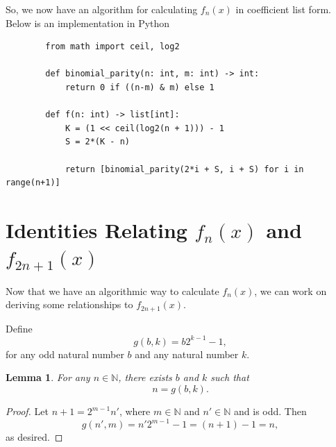 \documentclass[a4paper]{article}
\newtheorem{lemma}{Lemma}
\newcommand{\N}{\mathbb{N}}
\begin{document}
	So, we now have an algorithm for calculating $f_n(x)$ in coefficient list form.
	Below is an implementation in Python
	\begin{center}
	\begin{verbatim}
		from math import ceil, log2
			
		def binomial_parity(n: int, m: int) -> int:
    		return 0 if ((n-m) & m) else 1
			
		def f(n: int) -> list[int]:
    		K = (1 << ceil(log2(n + 1))) - 1
    		S = 2*(K - n)
			
    		return [binomial_parity(2*i + S, i + S) for i in range(n+1)]
	\end{verbatim}
	\end{center}

	\section{Identities Relating $f_n(x)$ and $f_{2n+1}(x)$}
	Now that we have an algorithmic way to calculate $f_n(x)$, we can work on deriving some relationships to $f_{2n+1}(x)$.
	
	Define
	\begin{equation*}
		g(b,k) = b 2^{k-1} - 1,
	\end{equation*}
	for any odd natural number $b$ and any natural number $k$.
	
	\begin{lemma}
		For any $n \in \N$, there exists $b$ and $k$ such that
		\begin{equation*}
			n = g(b,k).
		\end{equation*}
	\end{lemma}
	\begin{proof}
		Let $n+1 = 2^{m-1}n'$, where $m \in \N$ and $n' \in \N$ and is odd.
		Then
		\begin{equation*}
			g(n', m) = n'2^{m-1} - 1 = (n+1) - 1 = n,
		\end{equation*}
		as desired.
	\end{proof}
	
\end{document}
